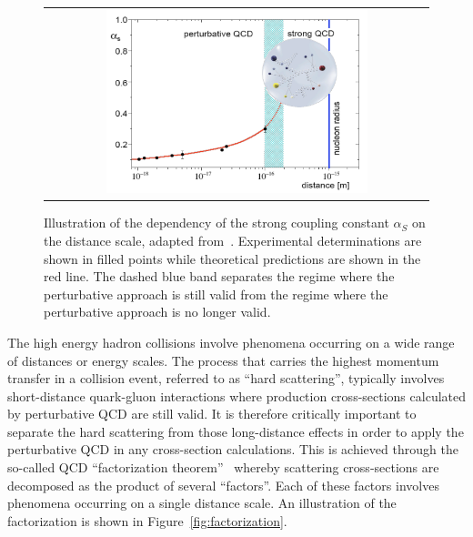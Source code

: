 \begin{figure}[tbh!]
 \begin{center}
 \begin{tabular}{c}
 \includegraphics[width=0.7\textwidth]{figures/Part1/QCD/pQCD}
 \end{tabular}
 \caption{Illustration of the dependency of the strong coupling constant $\alpha_{S}$ on the distance scale, adapted from~\cite{Messchendorp:2013ysj}. Experimental determinations are shown in filled points while theoretical predictions are shown in the red line. The dashed blue band separates the regime where the perturbative approach is still valid from the regime where the perturbative approach is no longer valid.}
 \label{fig:pQCD}
 \end{center}
\end{figure}

The high energy hadron collisions involve phenomena occurring on a wide range of distances or energy scales. The process that carries the highest momentum transfer in a collision event, referred to as ``hard scattering'', typically involves short-distance quark-gluon interactions where production cross-sections calculated by perturbative \ac{QCD} are still valid. It is therefore critically important to separate the hard scattering from those long-distance effects in order to apply the perturbative \ac{QCD} in any cross-section calculations. This is achieved through the so-called \ac{QCD} ``factorization theorem''~\cite{Collins:1989gx} whereby scattering cross-sections are decomposed as the product of several ``factors''. Each of these factors involves phenomena occurring on a single distance scale. An illustration of the factorization is shown in Figure~\ref{fig:factorization}.


